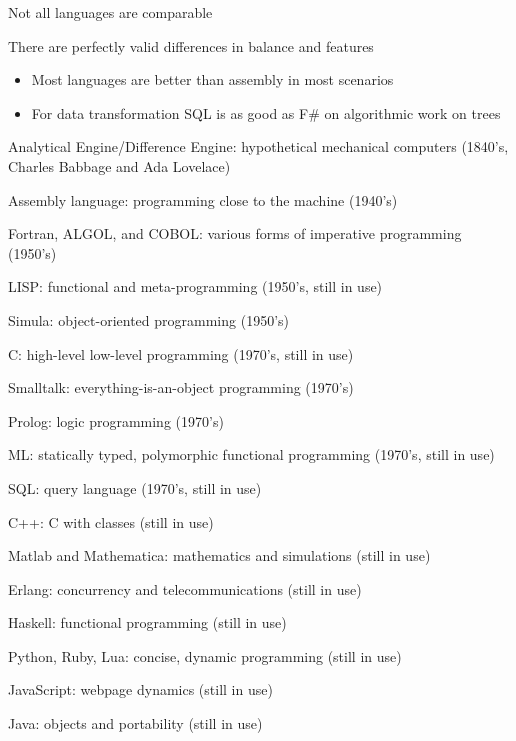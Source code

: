 \documentclass{beamer}
\begin{document}
\begin{slide}{
\item Not all languages are comparable
\item There are perfectly valid differences in balance and features
\begin{itemize}
\item Most languages are better than assembly in most scenarios
\item For data transformation SQL is as good as F\# on algorithmic work on trees
\end{itemize}
}\end{slide}

\begin{slide}{
\item Analytical Engine/Difference Engine: hypothetical mechanical computers (1840's, Charles Babbage and Ada Lovelace)
\item Assembly language: programming close to the machine (1940's)
\item Fortran, ALGOL, and COBOL: various forms of imperative programming (1950's)
\item LISP: functional and meta-programming (1950's, still in use)
\item Simula: object-oriented programming (1950's)
\item C: high-level low-level programming (1970's, still in use)
\item Smalltalk: everything-is-an-object programming (1970's)
\item Prolog: logic programming (1970's)
\item ML: statically typed, polymorphic functional programming (1970's, still in use)
\item SQL: query language (1970's, still in use)
}\end{slide}

\begin{slide}{
\item C++: C with classes (still in use)
\item Matlab and Mathematica: mathematics and simulations (still in use)
\item Erlang: concurrency and telecommunications (still in use)
}\end{slide}

\begin{slide}{
\item Haskell: functional programming (still in use)
\item Python, Ruby, Lua: concise, dynamic programming (still in use)
\item JavaScript: webpage dynamics (still in use)
\item Java: objects and portability (still in use)
}\end{slide}
\end{document}

